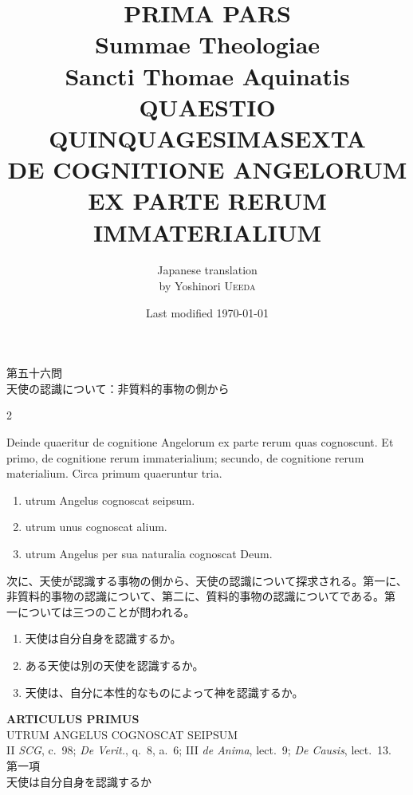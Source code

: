 \documentclass[paper=a4paper,fontsize=10pt,jafontsize=9pt,titlepage]{jlreq}
\title{{\bfseries PRIMA PARS}\\{\Huge Summae Theologiae}\\Sancti Thomae
Aquinatis\\{\sffamily QUAESTIO QUINQUAGESIMASEXTA}\\DE COGNITIONE
ANGELORUM EX PARTE RERUM IMMATERIALIUM}
\author{Japanese translation\\by Yoshinori {\scshape Ueeda}}
\date{Last modified \today}
\begin{document}
\maketitle
\pagestyle{fancy}

\begin{center}
{\Large 第五十六問\\天使の認識について：非質料的事物の側から}
\end{center}

\begin{paracol}{2}

Deinde quaeritur de cognitione Angelorum ex parte rerum quas
cognoscunt. Et primo, de cognitione rerum immaterialium; secundo, de
cognitione rerum materialium. Circa primum quaeruntur tria.

\begin{enumerate}
\item utrum Angelus cognoscat seipsum.
\item utrum unus cognoscat alium.
\item utrum Angelus per sua naturalia cognoscat Deum.
\end{enumerate}

\switchcolumn

次に、天使が認識する事物の側から、天使の認識について探求される。第一に、
非質料的事物の認識について、第二に、質料的事物の認識についてである。第
一については三つのことが問われる。

\begin{enumerate}
 \item 天使は自分自身を認識するか。
 \item ある天使は別の天使を認識するか。
 \item 天使は、自分に本性的なものによって神を認識するか。
\end{enumerate}

\end{paracol}
\newpage
{}
{}
\setcounter{section}{1}
\setcounter{subsection}{0}


\begin{center}
{\Large {\bfseries ARTICULUS PRIMUS}}\\ {\large UTRUM ANGELUS COGNOSCAT
SEIPSUM}\\ {\footnotesize II {\itshape SCG}, c.~98; {\itshape De
Verit.}, q.~8, a.~6; III {\itshape de Anima}, lect.~9; {\itshape De
Causis}, lect.~13.}\\ {\Large 第一項\\天使は自分自身を認識するか}
\end{center}
\end{document}
